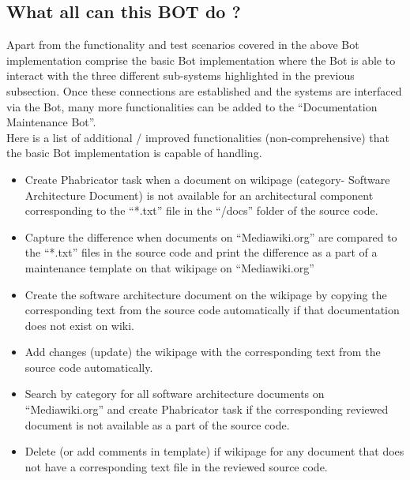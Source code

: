 \subsection{What all can this BOT do ? }
\indent Apart from the functionality and test scenarios covered in the above Bot implementation comprise the basic Bot implementation where the Bot is able to interact with the three different sub-systems highlighted in the previous subsection. Once these connections are established and the systems are interfaced via the Bot, many more functionalities can be added to the \enquote{Documentation Maintenance Bot}.
\\\indent Here is a list of additional / improved functionalities (non-comprehensive) that the basic Bot implementation is capable of handling.
\begin{itemize}
\item Create Phabricator task when a document on wikipage (category- Software Architecture Document) is not available for an architectural component corresponding to the \enquote{*.txt} file in the \enquote{/docs} folder of the source code.
\item Capture the difference when documents on \enquote{Mediawiki.org} are compared to the \enquote{*.txt} files in the source code and print the difference as a part of a maintenance template on that wikipage on \enquote{Mediawiki.org}
\item Create the software architecture document on the wikipage by copying the corresponding text from the source code automatically if that documentation does not exist on wiki.
\item Add changes (update) the wikipage with the corresponding text from the source code automatically.
\item Search by category for all software architecture documents on \enquote{Mediawiki.org} and create Phabricator task if the corresponding reviewed document is not available as a part of the source code.
\item Delete (or add comments in template) if wikipage for any document that does not have a corresponding text file in the reviewed source code.
\end{itemize}


